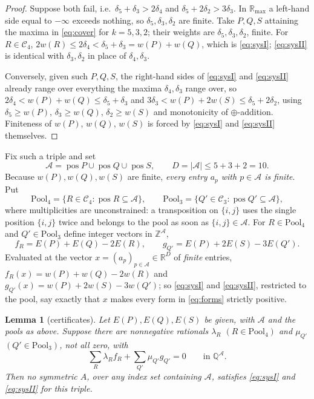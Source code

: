 \documentclass[11pt]{amsart}
\newtheorem{lemma}[theorem]{Lemma}
\newcommand{\Rmax}{\mathbb R_{\max}}
\newcommand{\dd}{\delta}
\newcommand{\Cov}{\mathcal C}
\newcommand{\Ee}{E}
\newcommand{\Allowed}{\mathcal A}
\newcommand{\pos}{\operatorname{pos}}
\begin{document}
\begin{proof}
Suppose both fail, i.e.\ $\dd_5+\dd_3>2\dd_4$ and $\dd_5+2\dd_2>3\dd_3$. In
$\Rmax$ a left-hand side equal to $-\infty$ exceeds nothing, so
$\dd_5,\dd_3,\dd_2$ are finite. Take $P,Q,S$ attaining the maxima in
\eqref{eq:cover} for $k=5,3,2$; their weights are $\dd_5,\dd_3,\dd_2$, finite.
For $R\in\Cov_4$, $2w(R)\le2\dd_4<\dd_5+\dd_3=w(P)+w(Q)$, which is
\eqref{eq:sysI}; \eqref{eq:sysII} is identical with $\dd_3,\dd_2$ in place of
$\dd_4,\dd_3$.

Conversely, given such $P,Q,S$, the right-hand sides of \eqref{eq:sysI} and
\eqref{eq:sysII} already range over everything the maxima $\dd_4,\dd_3$ range
over, so $2\dd_4<w(P)+w(Q)\le\dd_5+\dd_3$ and
$3\dd_3<w(P)+2w(S)\le\dd_5+2\dd_2$, using $\dd_5\ge w(P)$, $\dd_3\ge w(Q)$,
$\dd_2\ge w(S)$ and monotonicity of $\oplus$-addition. Finiteness of $w(P)$,
$w(Q)$, $w(S)$ is forced by \eqref{eq:sysI} and \eqref{eq:sysII} themselves.
\end{proof}

Fix such a triple and set
\[
 \Allowed=\pos P\cup\pos Q\cup\pos S,
 \qquad D=|\Allowed|\le5+3+2=10 .
\]
Because $w(P),w(Q),w(S)$ are finite, \emph{every entry $a_p$ with
$p\in\Allowed$ is finite}. Put
\[
 \mathrm{Pool}_4=\{R\in\Cov_4:\pos R\subseteq\Allowed\},
 \qquad
 \mathrm{Pool}_3=\{Q'\in\Cov_3:\pos Q'\subseteq\Allowed\},
\]
where multiplicities are unconstrained: a transposition on $\{i,j\}$ uses the
single position $\{i,j\}$ twice and belongs to the pool as soon as
$\{i,j\}\in\Allowed$. For $R\in\mathrm{Pool}_4$ and $Q'\in\mathrm{Pool}_3$
define integer vectors in $\mathbb Z^{\Allowed}$,
\begin{equation}\label{eq:forms}
 f_R=\Ee(P)+\Ee(Q)-2\Ee(R),
 \qquad
 g_{Q'}=\Ee(P)+2\Ee(S)-3\Ee(Q').
\end{equation}
Evaluated at the vector $x=(a_p)_{p\in\Allowed}\in\mathbb R^D$ of \emph{finite}
entries, $f_R(x)=w(P)+w(Q)-2w(R)$ and $g_{Q'}(x)=w(P)+2w(S)-3w(Q')$; so
\eqref{eq:sysI} and \eqref{eq:sysII}, restricted to the pool, say exactly that
$x$ makes every form in \eqref{eq:forms} strictly positive.

\begin{lemma}[certificates]\label{lem:cert}
Let $\Ee(P),\Ee(Q),\Ee(S)$ be given, with $\Allowed$ and the pools as above.
Suppose there are nonnegative rationals $\lambda_R$ $(R\in\mathrm{Pool}_4)$ and
$\mu_{Q'}$ $(Q'\in\mathrm{Pool}_3)$, not all zero, with
\begin{equation}\label{eq:certificate}
 \sum_R\lambda_Rf_R+\sum_{Q'}\mu_{Q'}g_{Q'}=0
 \qquad\text{in }\mathbb Q^{\Allowed}.
\end{equation}
Then no symmetric $A$, over any index set containing $\Allowed$, satisfies
\eqref{eq:sysI} and \eqref{eq:sysII} for this triple.
\end{lemma}
\end{document}
